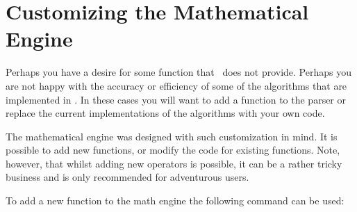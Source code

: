 %
%
%


\section{Customizing the Mathematical Engine}

\label{pgfmath-reimplement}


Perhaps you have a desire for some function that \pgfname\ does not
provide. Perhaps you are not happy with the accuracy or efficiency of
some of the algorithms that are implemented in \pgfname. In these
cases you will want to add a function to the parser or replace the
current implementations of the algorithms with your own code.

The mathematical engine was designed with such customization in mind.
It is possible to add new functions, or modify the code for
existing functions. Note, however, that whilst adding new operators
is possible, it can be a rather tricky business and is only
recommended for adventurous users.

To add a new function to the math engine the following command can be
used:


